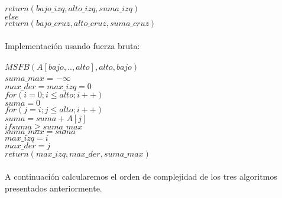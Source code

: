 \documentclass[12pt,twoside]{article}
\begin{document}
\hspace*{2.5cm}$return (bajo\_izq, alto\_izq, suma\_izq)$\\
\hspace*{2cm}$else$\\
\hspace*{2.5cm}$return (bajo\_cruz, alto\_cruz, suma\_cruz)$\\\\
Implementaci\'on usando fuerza bruta:\\\\
\hspace*{1cm}$MSFB(A[bajo,..,alto],alto,bajo)$\\
\hspace*{2cm}$suma\_max$ = $-\infty$\\
\hspace*{2cm}$max\_der = max\_izq = 0$\\
\hspace*{2cm}$for(i=0;i \leq alto;i++)$\\
\hspace*{2.5cm}$suma = 0$\\
\hspace*{2.5cm}$for(j=i;j \leq alto;i++)$\\
\hspace*{3cm}$suma = suma + A[j]$\\
\hspace*{3cm}$if suma \geq suma\_max$\\
\hspace*{3.5cm}$suma\_max = suma$\\
\hspace*{3.5cm}$max\_izq = i$\\
\hspace*{3.5cm}$max\_der = j$\\
\hspace*{2cm}$return (max\_izq, max\_der, suma\_max)$\\\\
A continuaci\'on calcularemos el orden de complejidad de los tres algoritmos presentados anteriormente.\\\\\\\\
\end{document}
